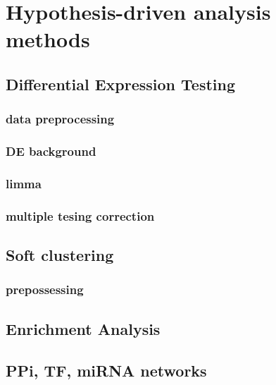 \newpage



\section{Hypothesis-driven analysis methods}    


    \subsection{Differential Expression Testing}
    
        \subsubsection{data preprocessing}
        \subsubsection{DE background}
        \subsubsection{limma}
        \subsubsection{multiple tesing correction}

    \subsection{Soft clustering}
        \subsubsection{prepossessing}
    
    \subsection{Enrichment Analysis}
    
    \subsection{PPi, TF, miRNA networks}